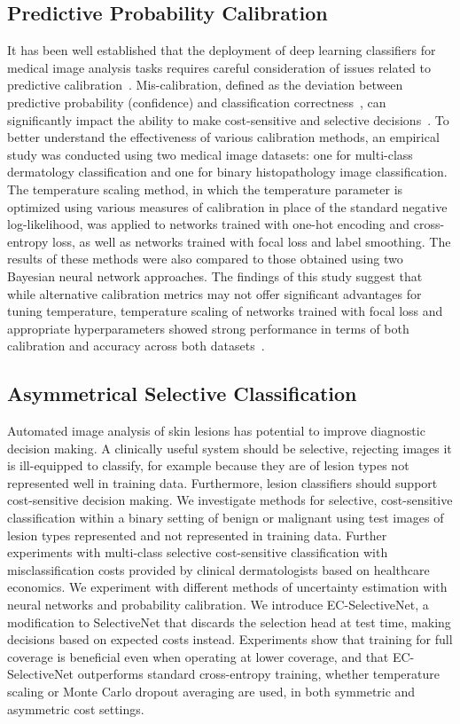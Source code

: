 \subsection*{Predictive Probability Calibration}
It has been well established that the deployment of deep learning classifiers for medical image analysis tasks requires careful consideration of issues related to predictive calibration~\cite{maron2019systematic}. Mis-calibration, defined as the deviation between predictive probability (confidence) and classification correctness~\cite{guo2017calibration}, can significantly impact the ability to make cost-sensitive and selective decisions~\cite{carse2021robust}. To better understand the effectiveness of various calibration methods, an empirical study was conducted using two medical image datasets: one for multi-class dermatology classification and one for binary histopathology image classification. The temperature scaling method, in which the temperature parameter is optimized using various measures of calibration in place of the standard negative log-likelihood, was applied to networks trained with one-hot encoding and cross-entropy loss, as well as networks trained with focal loss and label smoothing. The results of these methods were also compared to those obtained using two Bayesian neural network approaches. The findings of this study suggest that while alternative calibration metrics may not offer significant advantages for tuning temperature, temperature scaling of networks trained with focal loss and appropriate hyperparameters showed strong performance in terms of both calibration and accuracy across both datasets~\cite{carse2022calibration}.

\subsection*{Asymmetrical Selective Classification}
Automated image analysis of skin lesions has potential to improve diagnostic decision making. A clinically useful system should be selective, rejecting images it is ill-equipped to classify, for example because they are of lesion types not represented well in training data. Furthermore, lesion classifiers should support cost-sensitive decision making. We investigate methods for selective, cost-sensitive classification within a binary setting of benign or malignant using test images of lesion types represented and not represented in training data. Further experiments with multi-class selective cost-sensitive classification with misclassification costs provided by clinical dermatologists based on healthcare economics. We experiment with different methods of uncertainty estimation with neural networks and probability calibration.
We introduce EC-SelectiveNet, a modification to SelectiveNet that discards the selection head at test time, making decisions based on expected costs instead. Experiments show that training for full coverage is beneficial even when operating at lower coverage, and that EC-SelectiveNet outperforms standard cross-entropy training, whether temperature scaling or Monte Carlo dropout averaging are used, in both symmetric and asymmetric cost settings.


